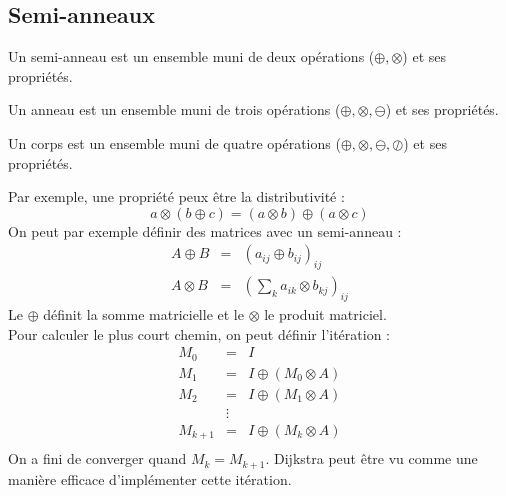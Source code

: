 \subsection{Semi-anneaux}
\begin{mydef}
Un semi-anneau est un ensemble muni de deux opérations ($\oplus,\otimes$) et ses propriétés.
\end{mydef}
\begin{mydef}
Un anneau est un ensemble muni de trois opérations ($\oplus,\otimes,\ominus$) et ses propriétés.
\end{mydef}
\begin{mydef}
Un corps est un ensemble muni de quatre opérations ($\oplus,\otimes,\ominus,\oslash$) et ses propriétés.
\end{mydef}
Par exemple, une propriété peux être la distributivité : 
$$a\otimes (b \oplus c) = (a \otimes b)\oplus(a \otimes c) $$
On peut par exemple définir des matrices avec un semi-anneau : 
\begin{eqnarray}
A \oplus B &=& (a_{ij} \oplus b_{ij})_{ij}\\
A \otimes B &=& (\sum_k a_{ik} \otimes b_{kj})_{ij}
\end{eqnarray}
Le $\oplus$ définit la somme matricielle et le $\otimes$ le produit matriciel.\\
Pour calculer le plus court chemin, on peut définir l'itération : 
\begin{eqnarray}
M_0 &=& I\\
M_1 &=& I \oplus (M_0 \otimes A)\\
M_2 &=& I \oplus (M_1 \otimes A)\\
 &\vdots &\\
M_{k+1} &=& I \oplus (M_k \otimes A)\\
\end{eqnarray}
On a fini de converger quand $M_k = M_{k+1}$. Dijkstra peut être vu comme une manière efficace d'implémenter cette itération.